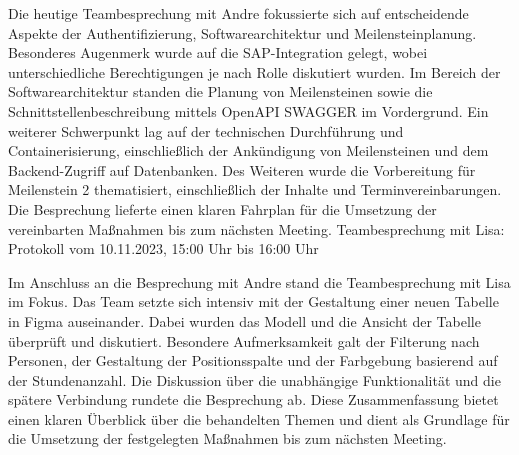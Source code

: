 \documentclass{article}
\begin{document}
    Die heutige Teambesprechung mit Andre fokussierte sich auf entscheidende Aspekte der Authentifizierung, Softwarearchitektur und Meilensteinplanung. Besonderes Augenmerk wurde auf die SAP-Integration gelegt, wobei unterschiedliche Berechtigungen je nach Rolle diskutiert wurden. Im Bereich der Softwarearchitektur standen die Planung von Meilensteinen sowie die Schnittstellenbeschreibung mittels OpenAPI SWAGGER im Vordergrund. Ein weiterer Schwerpunkt lag auf der technischen Durchführung und Containerisierung, einschließlich der Ankündigung von Meilensteinen und dem Backend-Zugriff auf Datenbanken.
    Des Weiteren wurde die Vorbereitung für Meilenstein 2 thematisiert, einschließlich der Inhalte und Terminvereinbarungen. Die Besprechung lieferte einen klaren Fahrplan für die Umsetzung der vereinbarten Maßnahmen bis zum nächsten Meeting.
    Teambesprechung mit Lisa: Protokoll vom 10.11.2023, 15:00 Uhr bis 16:00 Uhr
    
    Im Anschluss an die Besprechung mit Andre stand die Teambesprechung mit Lisa im Fokus. Das Team setzte sich intensiv mit der Gestaltung einer neuen Tabelle in Figma auseinander. Dabei wurden das Modell und die Ansicht der Tabelle überprüft und diskutiert. Besondere Aufmerksamkeit galt der Filterung nach Personen, der Gestaltung der Positionsspalte und der Farbgebung basierend auf der Stundenanzahl. Die Diskussion über die unabhängige Funktionalität und die spätere Verbindung rundete die Besprechung ab.
    Diese Zusammenfassung bietet einen klaren Überblick über die behandelten Themen und dient als Grundlage für die Umsetzung der festgelegten Maßnahmen bis zum nächsten Meeting.



\newpage



\end{document}
